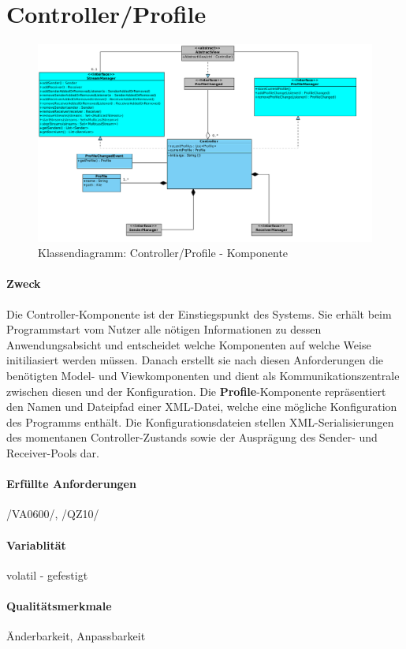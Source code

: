 \section{Controller/Profile}
\label{sec:4:steuer}
\begin{figure}[H]
\includegraphics[width=15cm]{images/Controller.png}
\centering
\caption{Klassendiagramm: Controller/Profile - Komponente}
\label{uml_controller}
\end{figure}

\paragraph{Zweck}
Die Controller-Komponente ist der Einstiegspunkt des Systems. Sie erhält beim
Programmstart vom Nutzer alle nötigen Informationen zu dessen Anwendungsabsicht
und entscheidet welche Komponenten auf welche Weise initiliasiert werden müssen.
Danach erstellt sie nach diesen Anforderungen die benötigten Model- und
Viewkomponenten und dient als Kommunikationszentrale zwischen diesen und der
Konfiguration. Die 
\textbf{Profile}-Komponente repräsentiert den Namen und Dateipfad
einer XML-Datei, welche eine mögliche Konfiguration des Programms enthält.
Die Konfigurationsdateien stellen XML-Serialisierungen des momentanen
Controller-Zustands sowie der Ausprägung des Sender- und Receiver-Pools dar.
\paragraph{Erfüllte Anforderungen}
/VA0600/, /QZ10/
\paragraph{Variablität}
volatil - gefestigt
\paragraph{Qualitätsmerkmale}
Änderbarkeit, Anpassbarkeit
